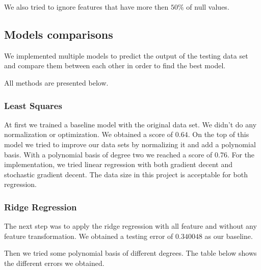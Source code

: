 \documentclass[10pt,conference,compsocconf]{IEEEtran}
\begin{document}
We also tried to ignore features that have more then $50\%$ of null values.

\subsection{Models comparisons}
We implemented multiple models to predict the output of the testing data set
and compare them between each other in order to find the best model.

All methods are presented below.

\subsubsection{Least Squares}
At first we trained a baseline model with the original data set. We didn't do any normalization or optimization. We obtained a score of $0.64$.
On the top of this model we tried to improve our data sets by normalizing it and add a polynomial basis. With a polynomial basis of degree two we reached a score of 0.76. For the implementation, we tried linear regression with both gradient decent and stochastic gradient decent. The data size in this project is acceptable for both regression. 

\subsubsection{Ridge Regression}

The next step was to apply the ridge regression with all feature and without any feature transformation. We obtained a testing error of $0.340048$ as our baseline.

Then we tried some polynomial basis of different degrees. The table below shows the different errors we obtained. 
\end{document}

